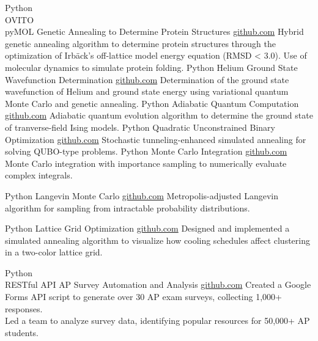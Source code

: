 \documentclass[9pt]{developercv} %
\begin{document}
\begin{entrylist}
    \entry
		{Python \\ OVITO \\ pyMOL }
		{Genetic Annealing to Determine Protein Structures}
		{\href{https://github.com/lonelyneutrin0/Protein-Structure-Prediction}{github.com}}
		{Hybrid genetic annealing algorithm to determine protein structures through the optimization of Irbäck's off-lattice model energy equation (RMSD < 3.0). Use of molecular dynamics to simulate protein folding.}
    \entry
		{Python}
		{Helium Ground State Wavefunction Determination}
		{\href{https://github.com/lonelyneutrin0/QMC}{github.com}}
		{Determination of the ground state wavefunction of Helium and ground state energy using variational quantum Monte Carlo and genetic annealing.}
	\entry
		{Python}
		{Adiabatic Quantum Computation}
		{\href{https://github.com/lonelyneutrin0/QA}{github.com}}
		{Adiabatic quantum evolution algorithm to determine the ground state of tranverse-field Ising models.}
	\entry
		{Python}
		{Quadratic Unconstrained Binary Optimization}
		{\href{https://github.com/lonelyneutrin0/qubo}{github.com}}
		{Stochastic tunneling-enhanced simulated annealing for solving QUBO-type problems.}
	\entry
		{Python}
		{Monte Carlo Integration}
		{\href{https://github.com/lonelyneutrin0/MNI}{github.com}}
		{Monte Carlo integration with importance sampling to numerically evaluate complex integrals.}
	
	\entry
		{Python}
		{Langevin Monte Carlo}
		{\href{https://github.com/lonelyneutrin0/LMC}{github.com}}
		{Metropolis-adjusted Langevin algorithm for sampling from intractable probability distributions.}
	
	\entry
		{Python}
		{Lattice Grid Optimization}
		{\href{https://github.com/lonelyneutrin0/lattice_grid}{github.com}}
		{Designed and implemented a simulated annealing algorithm to visualize how cooling schedules affect clustering in a two-color lattice grid.}
	
	\entry
	{Python \\ RESTful API}
	{AP Survey Automation and Analysis}
	{\href{https://github.com/lonelyneutrin0/APSurveyAutomation}{github.com}}
	{Created a Google Forms API script to generate over 30 AP exam surveys, collecting 1,000+ responses.\\Led a team to analyze survey data, identifying popular resources for 50,000+ AP students.}
	\end{entrylist}
	
\end{document}
